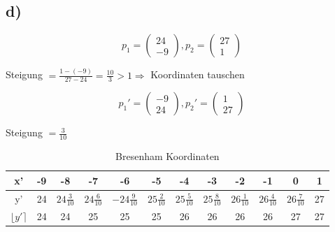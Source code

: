 \documentclass{article}
\begin{document}
\subsection*{d)}


\[
    p_1 =
   \begin{pmatrix}
   24 \\ -9
   \end{pmatrix},
   p_2 =
   \begin{pmatrix}
   27 \\ 1
   \end{pmatrix} 
\]
   \begin{center}
   Steigung $= \frac{1-(-9)}{27-24}=\frac{10}{3} > 1 \Rightarrow$ Koordinaten tauschen
   \end{center}
   
\[
    p_1' =
   \begin{pmatrix}
   -9 \\ 24
   \end{pmatrix},
   p_2' =
   \begin{pmatrix}
   1 \\ 27
   \end{pmatrix} 
\]
   \begin{center}
   Steigung $= \frac{3}{10}$\checkmark
   \end{center}

\begin{table}[]
    \centering
    \begin{tabular}{|c|c|c|c|c|c|c|c|c|c|c|c|}
         \hline
         x' & -9 & -8 & -7 & -6 & -5 & -4 & -3 & -2 & -1 & 0 & 1 \\
         \hline
         y' & 24 & $24\frac{3}{10}$ & $24\frac{6}{10}$ & $-24\frac{9}{10}$ & $25\frac{2}{10}$ & $25\frac{5}{10}$ & $25\frac{8}{10}$ & $26\frac{1}{10}$ & $26\frac{4}{10}$ & $26\frac{7}{10}$ & 27  \\
         \hline
         $\lfloor y' \rceil$ & 24 & 24 & 25 & 25 & 25 & 26 & 26 & 26 & 26 & 27 & 27\\
         \hline
    \end{tabular}
    \caption{Bresenham Koordinaten}
    \label{tab:my_label}
\end{table}
\end{document}
